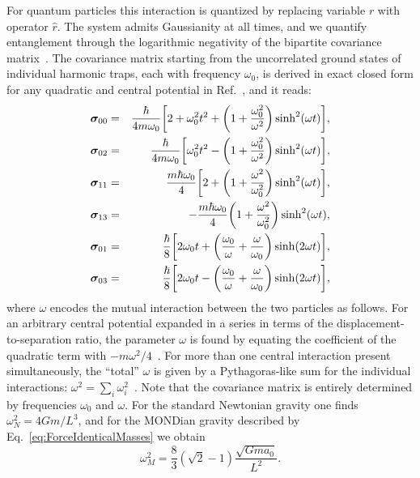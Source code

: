 \documentclass[aps,prd,reprint,superscriptaddress,nofootinbib,floatfix]{revtex4-2}
\begin{document}
For quantum particles this interaction is quantized by replacing variable $r$ with operator $\hat r$.
The system admits Gaussianity at all times, and we quantify entanglement through the logarithmic negativity of the bipartite covariance matrix~\cite{PPTCrit-CV-Simon2000,Negativity-Gaussian-Adesso2005,Negativity-Vidal2002,Negativity-CV-Serafini2004}.
The covariance matrix starting from the uncorrelated ground states of individual harmonic traps, each with frequency $\omega_0$, is derived in exact closed form for any quadratic and central potential in Ref.~\cite{QuantGrav-Ankit2022}, and it reads:
\begin{eqnarray}
\bm{\sigma}_{00}  &=& \frac{\hbar}{4m\omega_0} \qty[ 2+\omega_0^2t^2+\qty( 1+\frac{\omega_0^2}{\omega^2} )\sinh^2(\omega t) ],   
\nonumber \\
\bm{\sigma}_{02}  &=& \frac{\hbar}{4m\omega_0} \qty[ \omega_0^2t^2-\qty(1+\frac{\omega_0^2}{\omega^2})\sinh^2(\omega t) ],
\nonumber \\
\bm{\sigma}_{11}   &=&  \frac{m\hbar\omega_0}{4} \qty[ 2+\qty( 1+\frac{\omega^2}{\omega_0^2} )\sinh^2(\omega t) ], 
\nonumber \\
\bm{\sigma}_{13} &=& - \frac{m\hbar\omega_0}{4} \qty( 1+\frac{\omega^2}{\omega_0^2} ) \sinh^2(\omega t), 
\nonumber \\
\bm{\sigma}_{01} &=& \frac{\hbar}{8} \qty[  2\omega_0 t + \qty( \frac{\omega_0}{\omega}+\frac{\omega}{\omega_0} )\sinh(2\omega t) ],   
\nonumber \\
\bm{\sigma}_{03} &=& \frac{\hbar}{8} \qty[  2\omega_0 t - \qty( \frac{\omega_0}{\omega}+\frac{\omega}{\omega_0} )\sinh(2\omega t) ],
\label{eq:CovMat_FreeFall}
\end{eqnarray}
where $\omega$ encodes the mutual interaction between the two particles as follows.
For an arbitrary central potential expanded in a series in terms of the displacement-to-separation ratio, the parameter $\omega$ is found by equating the coefficient of the quadratic term with $-m\omega^2/4$~\cite{QuantGrav-Ankit2022}.
For more than one central interaction present simultaneously, the ``total'' $\omega$ is given by a Pythagoras-like sum for the individual interactions: $\omega^2 =  
\sum_i \omega_i^2$~\cite{QuantGrav-Ankit2022}.
Note that the covariance matrix is entirely determined by frequencies $\omega_0$ and $\omega$.
For the standard Newtonian gravity one finds $\omega_N^2 = 4Gm/L^3$, and for the MONDian gravity described by Eq.~\ref{eq:ForceIdenticalMasses} we obtain
\begin{equation}
\omega^2_M = \frac{8}{3}(\sqrt{2}-1) \frac{\sqrt{Gma_0}}{L^2}.
\end{equation}
\end{document}
